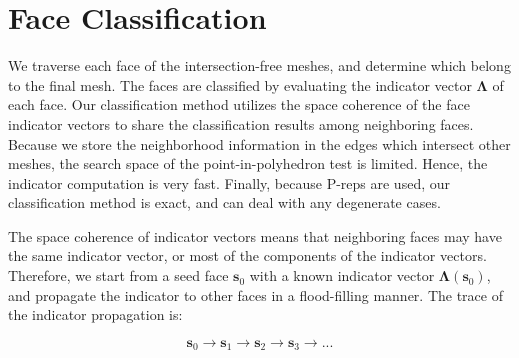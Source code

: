 

\section{Face Classification}

\label{sec:classification}

We traverse each face of the intersection-free meshes, and determine which belong to the final mesh. The faces are classified by evaluating the indicator vector $\bm{\Lambda}$ of each face. Our classification method utilizes the space coherence of the face indicator vectors to share the classification results among neighboring faces. Because we store the neighborhood information in the edges which intersect other meshes, the search space of the point-in-polyhedron test is limited. Hence, the indicator computation is very fast. Finally, because P-reps are used, our classification method is exact, and can deal with any degenerate cases.



The space coherence of indicator vectors means that neighboring faces may have the same indicator vector, or most of the components of the indicator vectors. Therefore, we start from a seed face $\bm{s}_0$ with a known indicator vector $\bm{\Lambda}(\bm{s}_0)$, and propagate the indicator to other faces in a flood-filling manner. The trace of the indicator propagation is:

\begin{equation}
\label{eq:trace}
\bm{s}_0\to \bm{s}_1\to \bm{s}_2\to \bm{s}_3\to ...
\end{equation}


